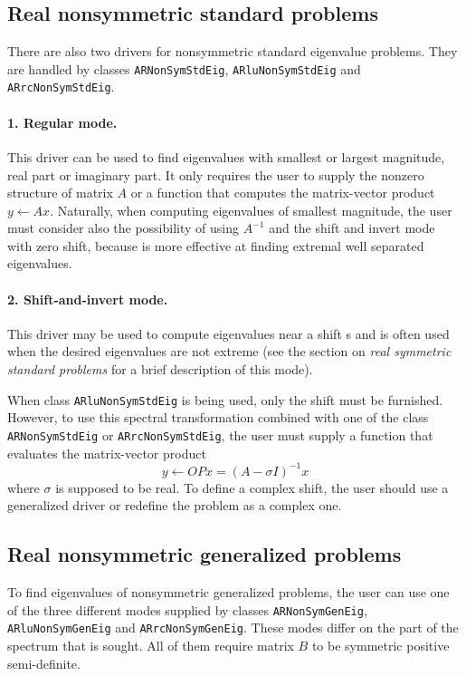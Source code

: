 \subsection{Real nonsymmetric standard problems}
There are also two drivers for nonsymmetric standard eigenvalue problems. They are handled by \ARPP{} classes \texttt{ARNonSymStdEig}, \texttt{ARluNonSymStdEig} and \texttt{ARrcNonSymStdEig}.

\paragraph{1. Regular mode.}
This driver can be used to find eigenvalues with smallest or largest magnitude, real part or imaginary part. It only requires the user to supply the nonzero structure of matrix $A$ or a function that computes the matrix-vector product $y \leftarrow Ax$. Naturally, when computing eigenvalues of smallest magnitude, the user must consider also the possibility of using $A^{-1}$ and the shift and invert mode with zero shift, because \ARP{} is more effective at finding extremal well separated eigenvalues.

\paragraph{2. Shift-and-invert mode.}
This driver may be used to compute eigenvalues near a shift s and is often used when the desired eigenvalues are not extreme (see the section on \textit{real symmetric standard problems }for a brief description of this mode). 

When class \texttt{ARluNonSymStdEig} is being used, only the shift must be furnished. However, to use this spectral transformation combined with one of the class \texttt{ARNonSymStdEig} or \texttt{ARrcNonSymStdEig}, the user must supply a function that evaluates the matrix-vector product
\[y \leftarrow OPx=(A-\sigma I)^{-1} x\]
where $\sigma$ is supposed to be real. To define a complex shift, the user should use a generalized driver or redefine the problem as a complex one.

\subsection{Real nonsymmetric generalized problems}
To find eigenvalues of nonsymmetric generalized problems, the user can use one of the three different modes supplied by \ARPP{} classes \texttt{ARNonSymGenEig}, \texttt{ARluNonSymGenEig} and \texttt{ARrcNonSymGenEig}. These modes differ on the part of the spectrum that is sought. All of them require matrix $B$ to be symmetric positive semi-definite.

